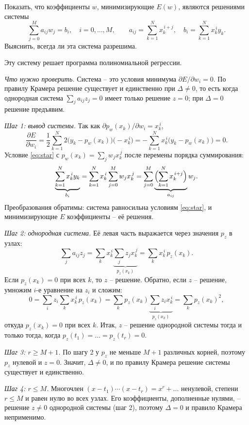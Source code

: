 \documentclass[12pt,a4paper]{article}
\begin{document}
\treb Показать, что коэффициенты $w$, минимизирующие $E(w)$, являются
решениями системы
\[
  \sum_{j=0}^{M} a_{ij} w_j = b_i, \quad i = 0, \dots, M,
  \qquad
  a_{ij} = \sum_{k=1}^{N} x_k^{\,i+j},
  \quad
  b_i = \sum_{k=1}^{N} x_k^{\,i} y_k .
\]
Выяснить, всегда ли эта система разрешима.

\zachem Эту систему решает программа полиномиальной регрессии.

\resh \emph{Что нужно проверить.} Система -- это условия минимума
$\partial E/\partial w_i = 0$. По правилу Крамера решение существует и
единственно при $\Delta \ne 0$, то есть когда однородная система
$\sum_j a_{ij}z_j = 0$ имеет только решение $z = 0$; при $\Delta = 0$ решение
предъявим.

\emph{Шаг 1: вывод системы.} Так как $\partial p_w(x_k)/\partial w_i = x_k^{\,i}$,
\begin{equation}\label{eq:star}
  \frac{\partial E}{\partial w_i}
  = \frac12\sum_{k=1}^{N} 2\bigl(y_k - p_w(x_k)\bigr)\bigl(-x_k^{\,i}\bigr)
  = -\sum_{k=1}^{N} x_k^{\,i}\bigl(y_k - p_w(x_k)\bigr) = 0 .
  \tag{$*$}
\end{equation}
Условие \eqref{eq:star} с $p_w(x_k) = \sum_j w_jx_k^{\,j}$ после перемены
порядка суммирования:
\[
  \underbrace{\sum_{k=1}^{N} x_k^{\,i}y_k}_{b_i}
  = \sum_{k=1}^{N} x_k^{\,i}\sum_{j=0}^{M} w_jx_k^{\,j}
  = \sum_{j=0}^{M}\underbrace{\Bigl(\sum_{k=1}^{N} x_k^{\,i+j}\Bigr)}_{a_{ij}} w_j .
\]
Преобразования обратимы: система равносильна условиям \eqref{eq:star}, и
минимизирующие $E$ коэффициенты -- её решения.

\emph{Шаг 2: однородная система.} Её левая часть выражается через значения
$p_z$ в узлах:
\[
  \sum_j a_{ij}z_j
  = \sum_k x_k^{\,i}\underbrace{\sum_j z_jx_k^{\,j}}_{p_z(x_k)}
  = \sum_k x_k^{\,i}\,p_z(x_k) .
\]
Если $p_z(x_k) = 0$ при всех $k$, то $z$ -- решение. Обратно, если $z$ --
решение, умножим $i$-е уравнение на $z_i$ и сложим:
\[
  0 = \sum_i z_i\sum_k x_k^{\,i}\,p_z(x_k)
    = \sum_k p_z(x_k)\underbrace{\sum_i z_ix_k^{\,i}}_{p_z(x_k)}
    = \sum_k p_z(x_k)^2 ,
\]
откуда $p_z(x_k) = 0$ при всех $k$. Итак, $z$ -- решение однородной системы
тогда и только тогда, когда $p_z(t_1) = \dots = p_z(t_r) = 0$.

\emph{Шаг 3: $r \ge M + 1$.} По шагу 2 у $p_z$ не меньше $M + 1$ различных
корней, поэтому $p_z$ нулевой и $z = 0$. Значит, $\Delta \ne 0$, и по правилу
Крамера решение системы существует и единственно.

\emph{Шаг 4: $r \le M$.} Многочлен $(x - t_1)\cdots(x - t_r) = x^r + \dots$
ненулевой, степени $r \le M$ и равен нулю во всех узлах. Его коэффициенты,
дополненные нулями, -- решение $z \ne 0$ однородной системы (шаг 2), поэтому
$\Delta = 0$ и правило Крамера неприменимо.
\end{document}
